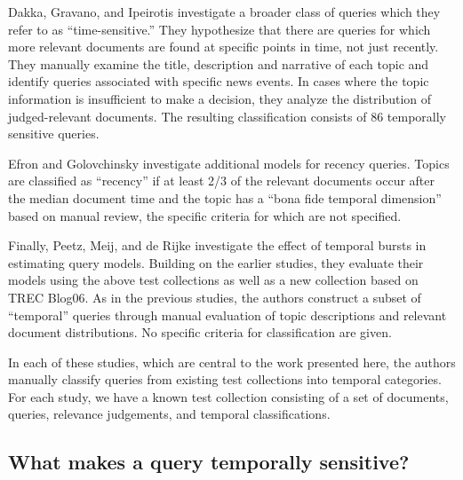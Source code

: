\documentclass{asist}
\begin{document}
Dakka, Gravano, and Ipeirotis  \cite{Dakka2012} investigate a broader class of queries which they refer to as ``time-sensitive.'' They hypothesize that there are queries for which more relevant documents are found at specific points in time, not just recently. They manually examine the title, description and narrative of each topic and identify queries associated with specific news events. In cases where the topic information is insufficient to make a decision, they analyze the distribution of judged-relevant documents. The resulting classification consists of 86 temporally sensitive queries. 

Efron and Golovchinsky \cite{Efron2011} investigate additional models for recency queries.  Topics are classified as ``recency'' if at least 2/3 of the relevant documents occur after the median document time and the topic has a ``bona fide temporal dimension'' based on manual review, the specific criteria for which are not specified.  

Finally, Peetz, Meij, and de Rijke \cite{Peetz2013a} investigate the effect of temporal bursts in estimating query models. Building on the earlier studies, they evaluate their models using the above test collections as well as a new collection based on TREC Blog06. As in the previous studies, the authors construct a subset of ``temporal'' queries through manual evaluation of topic descriptions and relevant document distributions. No specific criteria for classification are given.

In each of these studies, which are central to the work presented here, the authors manually classify queries from existing test collections into temporal categories. For each study, we have a known test collection consisting of a set of documents, queries, relevance judgements, and temporal classifications.  


\subsection{What makes a query temporally sensitive?}
\end{document}
